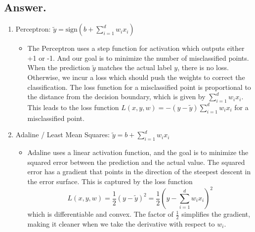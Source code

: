 \documentclass{article}
\begin{document}
      
\subsection*{Answer.}
\begin{enumerate}
    \item Perceptron: $\tilde{y} = \text{sign}(b + \sum_{i=1}^{d} w_i x_i)$
    \begin{itemize}
        \item The Perceptron uses a step function for activation which outputs either +1 or -1.
        And our goal is to minimize the number of misclassified points.
        When the prediction $\tilde{y}$ matches the actual label $y$, there is no loss.
        Otherwise, we incur a loss which should push the weights to correct the classification.
        The loss function for a misclassified point is proportional to the distance from the decision boundary, which is given by $\sum_{i=1}^{d} w_i x_i$.
        This leads to the loss function $L(x, y, w) = - (y - \tilde{y}) \sum_{i=1}^{d} w_i x_i$ for a misclassified point.
    \end{itemize}

    \item Adaline / Least Mean Squares: $\tilde{y} = b + \sum_{i=1}^{d} w_i x_i$
    \begin{itemize}
        \item Adaline uses a linear activation function, and
        the goal is to minimize the squared error between the prediction and the actual value.
        The squared error has a gradient that points in the direction of the steepest descent in the error surface.
        This is captured by the loss function \[L(x, y, w) = \frac{1}{2} (y - \tilde{y})^2 = \frac{1}{2} \left(y - \sum_{i=1}^{d} w_i x_i\right)^2\]
        which is differentiable and convex.
        The factor of $\frac{1}{2}$ simplifies the gradient, making it cleaner when we take the derivative with respect to $w_i$.
    \end{itemize}


\end{enumerate}
\end{document}
